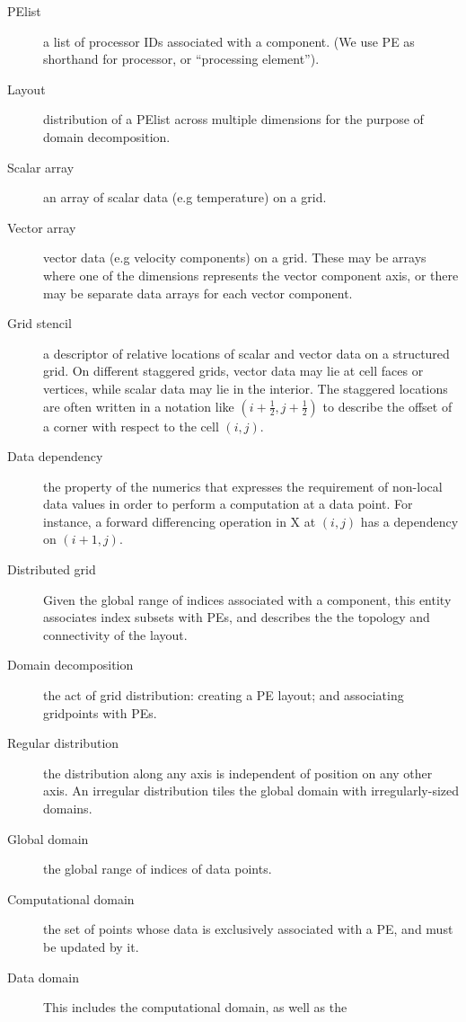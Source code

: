 
\begin{description}
\item[PElist] a list of processor IDs associated with a component. (We
  use PE as shorthand for processor, or ``processing element'').
\item[Layout] distribution of a PElist across multiple dimensions for
  the purpose of domain decomposition.
\item[Scalar array] an array of scalar data (e.g temperature) on a
  grid.
\item[Vector array] vector data (e.g velocity components) on a
  grid. These may be arrays where one of the dimensions represents the
  vector component axis, or there may be separate data arrays for each
  vector component.
\item[Grid stencil] a descriptor of relative locations of scalar and
  vector data on a structured grid. On different staggered grids,
  vector data may lie at cell faces or vertices, while scalar data may
  lie in the interior. The staggered locations are often written
  in a notation like $(i+\frac12,j+\frac12)$ to describe the offset of
  a corner with respect to the cell $(i,j)$.
\item[Data dependency] the property of the numerics that expresses the
  requirement of non-local data values in order to perform a
  computation at a data point. For instance, a forward differencing
  operation in X at $(i,j)$ has a dependency on $(i+1,j)$.
\item[Distributed grid] Given the global range of indices associated
  with a component, this entity associates index subsets with PEs, and
  describes the the topology and connectivity of the layout.
\item[Domain decomposition] the act of grid distribution: creating a
  PE layout; and associating gridpoints with PEs.
\item[Regular distribution] the distribution along any axis is
  independent of position on any other axis. An irregular distribution
  tiles the global domain with irregularly-sized domains.
\item[Global domain] the global range of indices of data points.
\item[Computational domain] the set of points whose data is
  exclusively associated with a PE, and must be updated by it.
\item[Data domain] This includes the computational domain, as well as the

\end{description}
